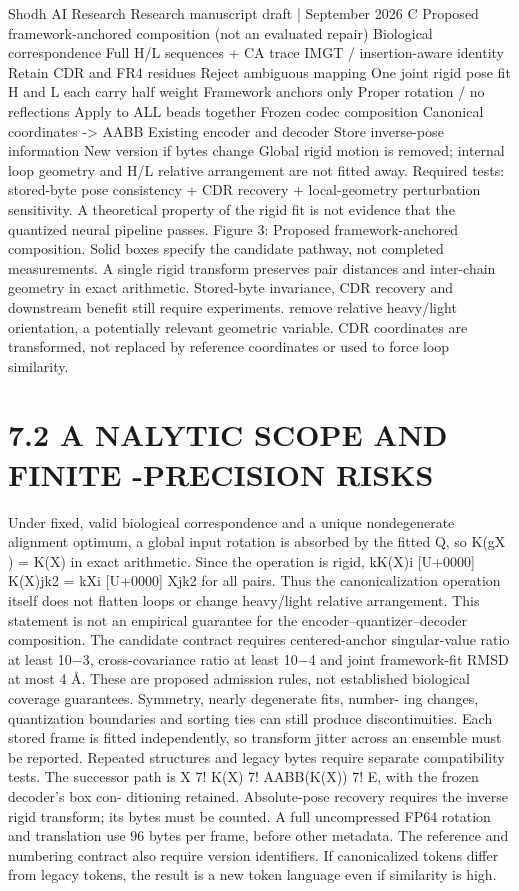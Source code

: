\documentclass[11pt]{article}
\begin{document}
Shodh AI Research Research manuscript draft | September 2026
C  Proposed framework-anchored composition (not an evaluated repair)
Biological correspondence
Full H/L sequences + CA trace
IMGT / insertion-aware identity
Retain CDR and FR4 residues
Reject ambiguous mapping
One joint rigid pose fit
H and L each carry half weight
Framework anchors only
Proper rotation / no reflections
Apply to ALL beads together
Frozen codec composition
Canonical coordinates -> AABB
Existing encoder and decoder
Store inverse-pose information
New version if bytes change
Global rigid motion is removed; internal loop geometry and H/L relative arrangement are not fitted away.
Required tests: stored-byte pose consistency + CDR recovery + local-geometry perturbation sensitivity.
A theoretical property of the rigid fit is not evidence that the quantized neural pipeline passes.
Figure 3: Proposed framework-anchored composition. Solid boxes specify the candidate pathway,
not completed measurements. A single rigid transform preserves pair distances and inter-chain
geometry in exact arithmetic. Stored-byte invariance, CDR recovery and downstream benefit still
require experiments.
remove relative heavy/light orientation, a potentially relevant geometric variable. CDR coordinates
are transformed, not replaced by reference coordinates or used to force loop similarity.

\section*{7.2 A NALYTIC SCOPE AND FINITE -PRECISION RISKS}

Under fixed, valid biological correspondence and a unique nondegenerate alignment optimum, a
global input rotation is absorbed by the fitted Q, so K(gX ) = K(X) in exact arithmetic. Since
the operation is rigid, kK(X)i [U+0000] K(X)jk2 = kXi [U+0000] Xjk2 for all pairs. Thus the canonicalization
operation itself does not flatten loops or change heavy/light relative arrangement. This statement is
not an empirical guarantee for the encoder–quantizer–decoder composition.
The candidate contract requires centered-anchor singular-value ratio at least 10\ensuremath{-}3, cross-covariance
ratio at least 10\ensuremath{-}4 and joint framework-fit RMSD at most 4 Å. These are proposed admission
rules, not established biological coverage guarantees. Symmetry, nearly degenerate fits, number-
ing changes, quantization boundaries and sorting ties can still produce discontinuities. Each stored
frame is fitted independently, so transform jitter across an ensemble must be reported. Repeated
structures and legacy bytes require separate compatibility tests.
The successor path is X 7! K(X) 7! AABB(K(X)) 7! E, with the frozen decoder’s box con-
ditioning retained. Absolute-pose recovery requires the inverse rigid transform; its bytes must be
counted. A full uncompressed FP64 rotation and translation use 96 bytes per frame, before other
metadata. The reference and numbering contract also require version identifiers. If canonicalized
tokens differ from legacy tokens, the result is a new token language even if similarity is high.
\end{document}
